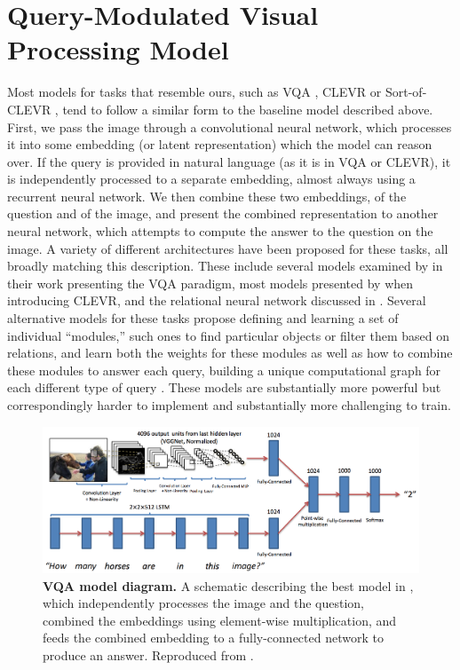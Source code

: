 \section{Query-Modulated Visual Processing Model}

Most models for tasks that resemble ours, such as VQA \parencite{Antol2015,Agrawal2016}, CLEVR \parencite{Johnson2017}  or Sort-of-CLEVR \parencite{Santoro}, tend to follow a similar form to the baseline model described above. First, we pass the image through a convolutional neural network, which processes it into some embedding (or latent representation) which the model can reason over. If the query is provided in natural language (as it is in VQA or CLEVR), it is independently processed to a separate embedding, almost always using a recurrent neural network. We then combine these two embeddings, of the question and of the image, and present the combined representation to another neural network, which attempts to compute the answer to the question on the image. A variety of different architectures have been proposed for these tasks, all broadly matching this description. These include several models examined by \textcite{Antol2015} in their work presenting the VQA paradigm, most models presented by \cite{Johnson2017} when introducing CLEVR, and the relational neural network discussed in \textcite{Santoro}. Several alternative models for these tasks propose defining and learning a set of individual ``modules,'' such ones to find particular objects or filter them based on relations, and learn both the weights for these modules as well as how to combine these modules to answer each query, building a unique computational graph for each different type of query \parencite{Johnson,Hu2017}. These models are substantially more powerful but correspondingly harder to implement and substantially more challenging to train.
\begin{figure}[!htb]
\centering
\includegraphics[width=\linewidth]{ch-models-compared/figures/reproduced.png}
\caption[VQA model diagram.]{{\bf VQA model diagram.} A schematic describing the best model in \textcite{Agrawal2016}, which independently processes the image and the question, combined the embeddings using element-wise multiplication, and feeds the combined embedding to a fully-connected network to produce an answer. Reproduced from \textcite{Agrawal2016}.}
\label{fig:vqa-model-diagram}
\end{figure}

